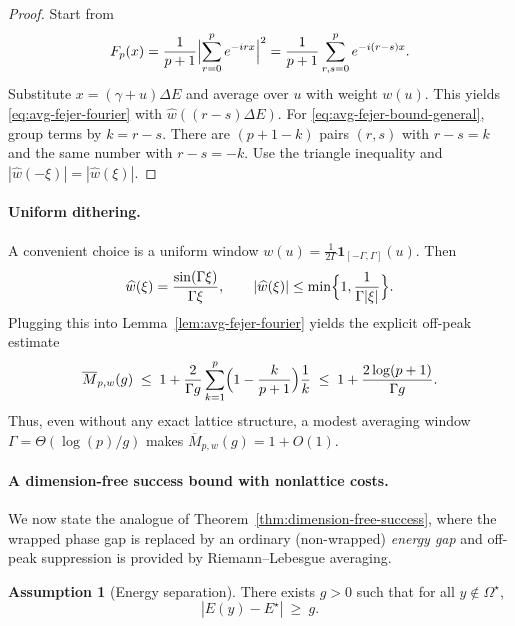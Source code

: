 \documentclass[a4paper,unpublished,onecolumn,11pt]{quantumarticle}
\theoremstyle{definition}
\newtheorem{assumption}[theorem]{Assumption}
\theoremstyle{remark}
\begin{document}
\begin{proof}
Start from
\[
F_p(x)
=\frac{1}{p+1}\Bigl|\sum_{r=0}^{p}e^{-irx}\Bigr|^2
=\frac{1}{p+1}\sum_{r,s=0}^{p} e^{-i(r-s)x}.
\]
Substitute $x=(\gamma+u)\Delta E$ and average over $u$ with weight $w(u)$.
This yields \eqref{eq:avg-fejer-fourier} with $\widehat w((r-s)\Delta E)$.
For \eqref{eq:avg-fejer-bound-general}, group terms by $k=r-s$.
There are $(p+1-k)$ pairs $(r,s)$ with $r-s=k$ and the same number with $r-s=-k$.
Use the triangle inequality and $|\widehat w(-\xi)|=|\widehat w(\xi)|$.
\end{proof}

\paragraph{Uniform dithering.}
A convenient choice is a uniform window $w(u)=\frac{1}{2\Gamma}\mathbf 1_{[-\Gamma,\Gamma]}(u)$. Then
\[
\widehat w(\xi)
=
\frac{\sin(\Gamma\xi)}{\Gamma\xi},
\qquad
|\widehat w(\xi)|\le \min\Bigl\{1,\frac{1}{\Gamma|\xi|}\Bigr\}.
\]
Plugging this into Lemma~\ref{lem:avg-fejer-fourier} yields the explicit off-peak estimate
\begin{equation}
\label{eq:avg-fejer-uniform}
\overline M_{p,w}(g)
\;\le\;
1
+
\frac{2}{\Gamma g}\sum_{k=1}^{p}\Bigl(1-\frac{k}{p+1}\Bigr)\frac{1}{k}
\;\le\;
1
+
\frac{2\log(p+1)}{\Gamma g}.
\end{equation}
Thus, even without any exact lattice structure, a modest averaging window
$\Gamma=\Theta(\log(p)/g)$ makes $\overline M_{p,w}(g)=1+O(1)$.

\paragraph{A dimension-free success bound with nonlattice costs.}
We now state the analogue of Theorem~\ref{thm:dimension-free-success}, where the
wrapped phase gap is replaced by an ordinary (non-wrapped) \emph{energy gap} and
off-peak suppression is provided by Riemann--Lebesgue averaging.

\begin{assumption}[Energy separation]
\label{assump:energy-gap}
There exists $g>0$ such that for all $y\notin \Omega^\star$,
\[
|E(y)-E^\star|\ \ge\ g.
\]
\end{assumption}
\end{document}

